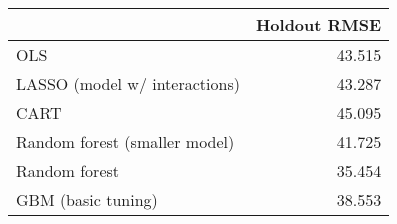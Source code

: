 
\begin{tabular}{lr}
\toprule
  & Holdout RMSE\\
\midrule
OLS & 43.515\\
LASSO (model w/ interactions) & 43.287\\
CART & 45.095\\
Random forest (smaller model) & 41.725\\
Random forest & 35.454\\
GBM (basic tuning) & 38.553\\
\bottomrule
\end{tabular}
